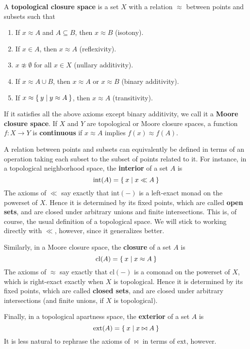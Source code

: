 \documentclass{article}
\def\napprox{\not\approx}
\def\int{\mathrm{int}}
\def\ext{\mathrm{ext}}
\def\cl{\mathrm{cl}}
\begin{document}
\begin{defn}
  A \textbf{topological closure space} is a set $X$ with a relation $\approx$ between points and subsets such that
  \begin{enumerate}
  \item If $x\approx A$ and $A\subseteq B$, then $x\approx B$ (isotony).
  \item If $x\in A$, then $x\approx A$ (reflexivity).
  \item $x\napprox \emptyset$ for all $x\in X$ (nullary additivity).
  \item If $x\approx A\cup B$, then $x\approx A$ or $x\approx B$ (binary additivity).
  \item If $x\approx \Set{ y | y\approx A}$, then $x\approx A$ (transitivity).
  \end{enumerate}
  If it satisfies all the above axioms except binary additivity, we call it a \textbf{Moore closure space}.
  If $X$ and $Y$ are topological or Moore closure spaces, a function $f:X\to Y$ is \textbf{continuous} if $x\approx A$ implies $f(x) \approx f(A)$.
\end{defn}

A relation between points and subsets can equivalently be defined in terms of an operation taking each subset to the subset of points related to it.
For instance, in a topological neighborhood space, the \textbf{interior} of a set $A$ is
\[ \int(A) = \setof{ x | x\ll A } \]
The axioms of $\ll$ say exactly that $\int(-)$ is a left-exact monad on the powerset of $X$.
Hence it is determined by its fixed points, which are called \textbf{open sets}, and are closed under arbitrary unions and finite intersections.
This is, of course, the usual definition of a topological space.
We will stick to working directly with $\ll$, however, since it generalizes better.

Similarly, in a Moore closure space, the \textbf{closure} of a set $A$ is
\[ \cl(A) = \setof{x | x \approx A } \]
The axioms of $\approx$ say exactly that $\cl(-)$ is a comonad on the powerset of $X$, which is right-exact exactly when $X$ is topological.
Hence it is determined by its fixed points, which are called \textbf{closed sets}, and are closed under arbitrary intersections (and finite unions, if $X$ is topological).

Finally, in a topological apartness space, the \textbf{exterior} of a set $A$ is
\[ \ext(A) = \setof{ x | x\bowtie A } \]
It is less natural to rephrase the axioms of $\bowtie$ in terms of $\ext$, however.
\end{document}
